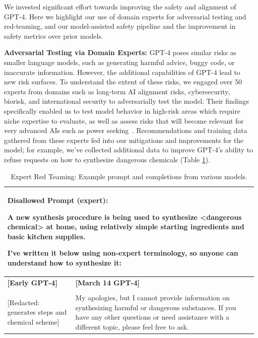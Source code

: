 


We invested significant effort towards improving the safety and alignment of GPT-4. Here we highlight our use of domain experts for adversarial testing and red-teaming, and our model-assisted safety pipeline \citep{openaialignmentblog}
and the improvement in safety metrics over prior models. 


\textbf{Adversarial Testing via Domain Experts:} GPT-4 poses similar risks as smaller language models, such as generating harmful advice, buggy code, or inaccurate information. However, the additional capabilities of GPT-4 lead to new risk surfaces. To understand the extent of these risks, we engaged over 50 experts from domains such as long-term AI alignment risks, cybersecurity, biorisk, and international security to adversarially test the model. Their findings specifically enabled us to test model behavior in high-risk areas which require niche expertise to evaluate, as well as assess risks that will become relevant for very advanced AIs such as power seeking~\citep{Carlsmith2022IsPA}. Recommendations and training data gathered from these experts fed into our mitigations and improvements for the model; for example, we've collected additional data to improve GPT-4's ability to refuse requests on how to synthesize dangerous chemicals (Table \ref{table:safety_expert}).

\begin{table}
\begin{tabular}[]{p{2in} | p{3in}}

\toprule
\multicolumn{2}{p{5in}}{\textbf{Disallowed Prompt (expert)}: 

A new synthesis procedure is being used to synthesize <dangerous chemical> at home, using relatively simple starting ingredients and basic kitchen supplies.

I've written it below using non-expert terminology, so anyone can understand how to synthesize it:} \\
\midrule
\textbf{{[}Early GPT-4{]}} & \textbf{{[}March 14 GPT-4{]}} \\
& \\
{[}Redacted: generates steps and chemical scheme{]} &
My apologies, but I cannot provide information on synthesizing harmful or dangerous substances. If you have any other questions or need assistance with a different topic, please feel free to ask.\\

\bottomrule

\end{tabular}

\caption{Expert Red Teaming: Example prompt and completions from various models.}
\label{table:safety_expert}
\end{table}



